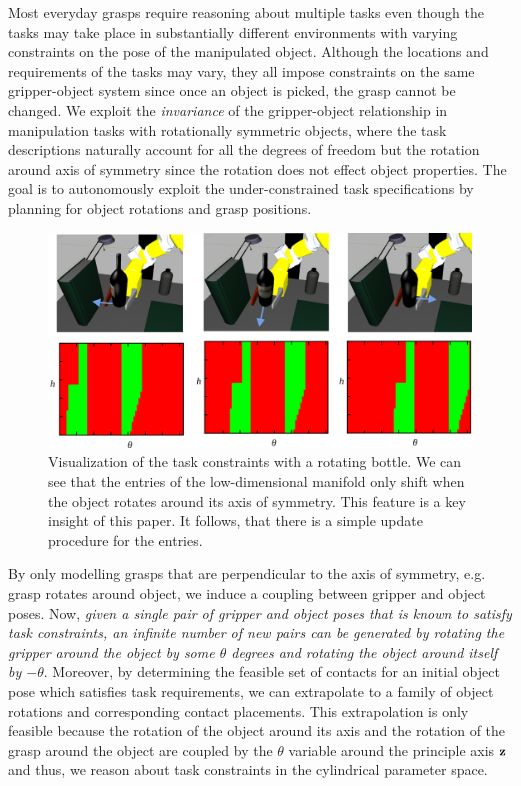 \documentclass[a4paper,10pt,twocolumn]{article}
\begin{document}
Most everyday grasps require reasoning about multiple tasks even though the tasks may take place in substantially different environments with varying constraints on the pose of the manipulated
object. Although the locations and requirements of the tasks may vary, they all impose constraints 
on the same gripper-object system since once an object is picked, the grasp cannot be changed. 
We exploit the \textit{invariance} of the gripper-object relationship in manipulation tasks with 
rotationally symmetric objects, where the task descriptions naturally account for all the degrees 
of freedom but the rotation around axis of symmetry since the rotation does not effect object properties. The goal is to autonomously exploit the under-constrained task specifications by planning for object rotations and grasp positions. 
\begin{figure}[ht]
  \begin{center}
    \includegraphics[width=0.75\linewidth]{./images/rotatingWine.png} \quad
  \end{center}
   \caption{Visualization of the task constraints with a rotating bottle. We can see that the entries of the low-dimensional manifold only shift when the object rotates around its axis of symmetry. This feature is a key insight of this paper. It follows, that there is a simple update procedure for the entries.}
  \label{fig:rotatingwine} 
\end{figure}
By only modelling grasps that are perpendicular to the axis of symmetry, e.g. grasp rotates around object, we induce a coupling between gripper and object poses. Now, \textit{given a single pair of gripper and object poses that is known to satisfy task constraints, an infinite number of new pairs can be generated by rotating the gripper around the object by some $\theta$ degrees and rotating the object around itself by $-\theta$}. Moreover, by determining the feasible set of contacts for an initial object
pose which satisfies task requirements, we can extrapolate to a family of object rotations and corresponding contact placements. This extrapolation is only feasible because the rotation of the object around its axis and the rotation of the grasp around the object are coupled by the $\theta$ variable around the principle axis $\textbf{z}$ and thus, we reason about task
constraints in the cylindrical parameter space.
\end{document}
